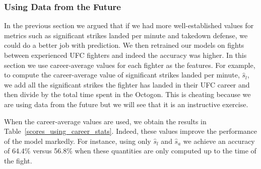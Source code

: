\clearpage
\subsubsection*{Using Data from the Future}

In the previous section we argued that if we had more
well-established values for metrics such as significant strikes
landed per minute and takedown defense, we could do a better
job with prediction. We then retrained our models on
fights between experienced UFC fighters
and indeed the accuracy was higher. In this section we use
career-average values for each fighter as the features.
For example, to compute the career-average value of significant
strikes landed per minute, $\hat{s}_l$, we add all the significant strikes
the fighter has landed in their UFC career and then divide by the
total time spent in the Octogon. This
is cheating because we are using data from the future but we
will see that it is an instructive exercise.

When the career-average values are used, we obtain the results
in Table~\ref{scores_using_career_stats}. Indeed, these
values improve the performance of the model markedly.
For instance, using only $\hat{s}_l$ and $\hat{s}_a$ we achieve an accuracy of
64.4\% versus 56.8\% when these quantities are only
computed up to the time of the fight.


